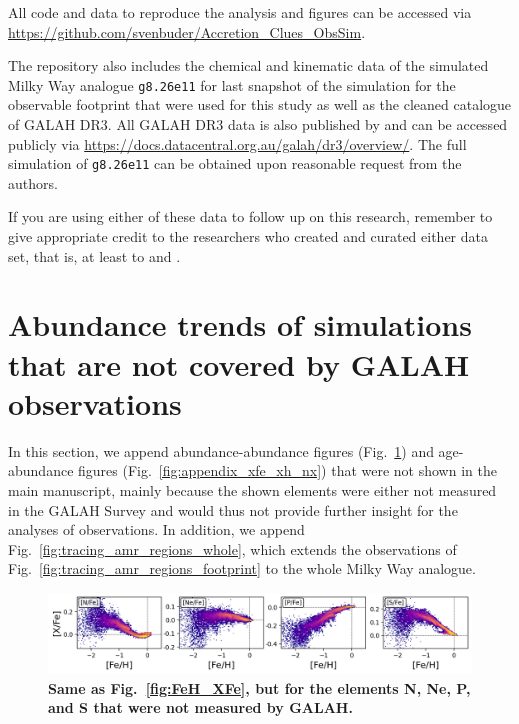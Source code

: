 \documentclass[fleqn,usenatbib]{mnras}
\begin{document}
All code and data to reproduce the analysis and figures can be accessed via \url{https://github.com/svenbuder/Accretion_Clues_ObsSim}.

The repository also includes the chemical and kinematic data of the simulated Milky Way analogue \texttt{g8.26e11} for last snapshot of the simulation for the observable footprint that were used for this study as well as the cleaned catalogue of GALAH DR3. All GALAH DR3 data is also published by \citet{Buder2021} and can be accessed publicly via \url{https://docs.datacentral.org.au/galah/dr3/overview/}. The full simulation of \texttt{g8.26e11} can be obtained upon reasonable request from the authors.

If you are using either of these data to follow up on this research, remember to give appropriate credit to the researchers who created and curated either data set, that is, at least to \citet{Buder2021, Buder2022} and \citet{Buck2020b, Buck2021}.





\appendix

\section{Abundance trends of simulations that are not covered by GALAH observations} \label{sec:appendix_other_abundances}

In this section, we append abundance-abundance figures (Fig.~\ref{fig:appendix_feh_xfe_nneps}) and age-abundance figures (Fig.~\ref{fig:appendix_xfe_xh_nx}) that were not shown in the main manuscript, mainly because the shown elements were either not measured in the GALAH Survey and would thus not provide further insight for the analyses of observations. In addition, we append Fig.~\ref{fig:tracing_amr_regions_whole}, which extends the observations of Fig.~\ref{fig:tracing_amr_regions_footprint} to the whole Milky Way analogue.

\begin{figure}
	\includegraphics[width=\textwidth]{figures/Overview_FeH_XFe_Sim_only.png}
    \caption{
    \textbf{Same as Fig.~\ref{fig:FeH_XFe}, but for the elements N, Ne, P, and S that were not measured by GALAH.}
    }
    \label{fig:appendix_feh_xfe_nneps}
\end{figure}
\end{document}

